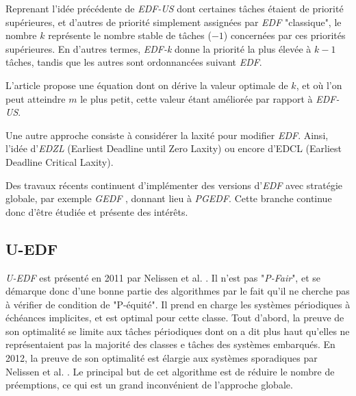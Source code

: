 \documentclass[11pt,a4paper,oneside]{report}
\begin{document}
	Reprenant l'idée précédente de \textit{EDF-US} dont certaines tâches étaient de priorité 
	supérieures, et d'autres de priorité simplement assignées par \textit{EDF} "classique", 
	le nombre $k$ représente le nombre stable de tâches ($-1$) concernées par ces priorités 
	supérieures. En d'autres termes, \textit{EDF-k} donne la priorité la plus élevée à 
	$k - 1$ tâches, tandis que les autres sont ordonnancées suivant \textit{EDF}.\medskip
	
	L'article propose une équation dont on dérive la valeur optimale de $k$, et où l'on peut 
	atteindre $m$ le plus petit, cette valeur étant améliorée par rapport à \textit{EDF-US}.\medskip
	
	Une autre approche consiste à considérer la laxité pour modifier \textit{EDF}. 
	Ainsi, l'idée d'\textit{EDZL} (Earliest Deadline until Zero Laxity) \cite{cirinei_edzl_2007} ou encore d'EDCL \cite{kato_real-time_2007}
	(Earliest Deadline Critical Laxity). \medskip
	
	Des travaux récents continuent d'implémenter des versions d'\textit{EDF} avec stratégie 
	globale, par exemple \textit{GEDF} \cite{li_global_2015}, donnant lieu à \textit{PGEDF}. Cette 
	branche continue donc d'être étudiée et présente des intérêts.
	
	\subsection{U-EDF}
	\textit{U-EDF} est présenté en 2011 par Nelissen et al. \cite{nelissen_reducing_2011}. Il n'est pas "\textit{P-Fair}", et se démarque donc d'une bonne partie des algorithmes 
	par le fait qu'il ne cherche pas à vérifier de condition de "P-équité".
	Il prend en charge les systèmes périodiques à échéances implicites, et est optimal pour cette classe. 
	Tout d'abord, la preuve de son optimalité se limite aux tâches périodiques dont on a dit plus haut qu'elles 
	ne représentaient pas la majorité des classes e tâches des systèmes embarqués. 
	En 2012, la preuve de son optimalité est élargie aux systèmes sporadiques par Nelissen et al. \cite{nelissen_u-edf_2012}. Le principal but de cet algorithme est de réduire le nombre de préemptions, 
	ce qui est un grand inconvénient de l'approche globale. \medskip
	
\end{document}
